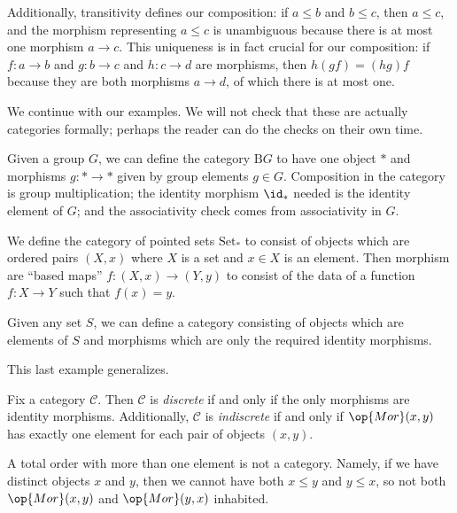 Additionally, transitivity defines our composition: if $a\le b$ and $b\le c$, then $a\le c$, and the morphism representing $a\le c$ is unambiguous because there is at most one morphism $a\to c$. This uniqueness is in fact crucial for our composition: if $f:a\to b$ and $g:b\to c$ and $h:c\to d$ are morphisms, then $h(gf)=(hg)f$ because they are both morphisms $a\to d$, of which there is at most one.

We continue with our examples. We will not check that these are actually categories formally; perhaps the reader can do the checks on their own time.
\begin{example}[Groups]
	Given a group $G$, we can define the category $\mathrm BG$ to have one object $*$ and morphisms $g:*\to*$ given by group elements $g\in G$. Composition in the category is group multiplication; the identity morphism $\id_*$ needed is the identity element of $G$; and the associativity check comes from associativity in $G$.
\end{example}
\begin{example}
	We define the category of pointed sets $\mathrm{Set}_*$ to consist of objects which are ordered pairs $(X,x)$ where $X$ is a set and $x\in X$ is an element. Then morphism are ``based maps'' $f:(X,x)\to(Y,y)$ to consist of the data of a function $f:X\to Y$ such that $f(x)=y$.
\end{example}
\begin{example}
	Given any set $S$, we can define a category consisting of objects which are elements of $S$ and morphisms which are only the required identity morphisms.
\end{example}
This last example generalizes.
\begin{definition}
	Fix a category $\mathcal C$. Then $\mathcal C$ is \textit{discrete} if and only if the only morphisms are identity morphisms. Additionally, $\mathcal C$ is \textit{indiscrete} if and only if $\op{Mor}(x,y)$ has exactly one element for each pair of objects $(x,y)$.
\end{definition}
\begin{warn}
	A total order with more than one element is not a category. Namely, if we have distinct objects $x$ and $y$, then we cannot have both $x\le y$ and $y\le x$, so not both $\op{Mor}(x,y)$ and $\op{Mor}(y,x)$ inhabited.
\end{warn}

